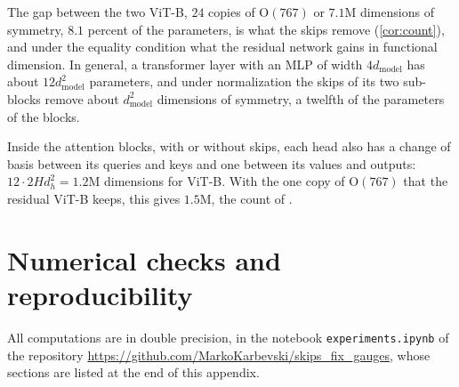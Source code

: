\documentclass[10pt]{article}
\theoremstyle{definition}
\theoremstyle{remark}
\newcommand{\dm}{d_{\mathrm{model}}}
\newcommand{\Ort}{\mathrm{O}}
\begin{document}
The gap between the two ViT-B, $24$ copies of $\Ort(767)$ or $7.1$M dimensions of symmetry, $8.1$ percent of the parameters, is what the skips remove (\cref{cor:count}), and under the equality condition what the residual network gains in functional dimension. In general, a transformer layer with an MLP of width $4\dm$ has about $12\dm^2$ parameters, and under normalization the skips of its two sub-blocks remove about $\dm^2$ dimensions of symmetry, a twelfth of the parameters of the blocks.

Inside the attention blocks, with or without skips, each head also has a change of basis between its queries and keys and one between its values and outputs: $12 \cdot 2Hd_h^2 = 1.2$M dimensions for ViT-B. With the one copy of $\Ort(767)$ that the residual ViT-B keeps, this gives $1.5$M, the count of \citet[Eq.~17]{vannierop2024gauge}.

\FloatBarrier
\section{Numerical checks and reproducibility}\label{app:checks}

All computations are in double precision, in the notebook \texttt{experiments.ipynb} of the repository \url{https://github.com/MarkoKarbevski/skips_fix_gauges}, whose sections are listed at the end of this appendix.
\end{document}
